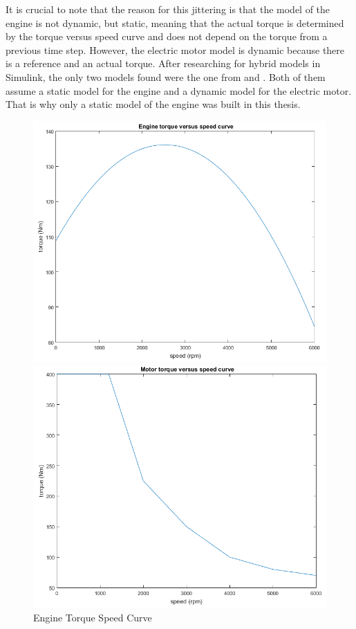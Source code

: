 It is crucial to note that the reason for this jittering is that the model of the engine is not dynamic, but static, meaning that the actual torque is determined by the torque versus speed curve and does not depend on the torque from a previous time step. However, the electric motor model is dynamic because there is a reference and an actual torque. After researching for hybrid models in Simulink, the only two models found were the one from \citet{hevMatlab} and \citet{hevMatlab2}. Both of them assume a static model for the engine and a dynamic model for the electric motor. That is why only a static model of the engine was built in this thesis.

\begin{figure}[h]
\centering
\begin{minipage}{.52\textwidth}
 	\centering
	\includegraphics[scale=0.36]{figures/enginecurve}
	\caption{Engine Torque Speed Curve}
	\label{fig:engineTorqueSpeed}
\end{minipage}%
\begin{minipage}{.52\textwidth}
  	\centering
	\includegraphics[scale=0.37]{figures/motorcurve}

\end{minipage}
\end{figure}
